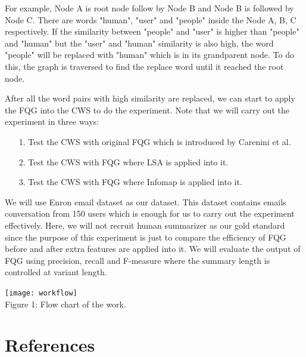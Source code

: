 \documentclass[a4paper, 12pt]{article}
\begin{document}
\begin{description}
For example, Node A is root node follow by Node B and Node B is followed by Node C. There are words "human", "user" and "people" inside the Node A, B, C respectively. If the similarity between "people" and "user" is higher than "people" and "human" but the "user" and "human" similarity is also high, the word "people" will be replaced with "human" which is in its grandparent node. To do this, the graph is traversed to find the replace word until it reached the root node.
\end{description}

\noindent
After all the word pairs with high similarity are replaced, we can start to apply the FQG into the CWS to do the experiment. Note that we will carry out the experiment in three ways:

\begin{itemize}
	\item[1.] Test the CWS with original FQG which is introduced by Carenini et al.

	\item[2.] Test the CWS with FQG where LSA is applied into it.

	\item[3.] Test the CWS with FQG where Infomap is applied into it.
\end{itemize}

\noindent
We will use Enron email dataset as our dataset. This dataset contains emails conversation from 150 users which is enough for us to carry out the experiment effectively. Here, we will not recruit human summarizer as our gold standard since the purpose of this experiment is just to compare the efficiency of FQG before and after extra features are applied into it. We will evaluate the output of FQG using precision, recall and F-measure where the summary length is controlled at variant length.
\begin{center}
\texttt{[image: workflow]}\\
Figure 1: Flow chart of the work.\\
\end{center}

\section*{References}
\renewcommand\refname{\vskip -1.35cm} %
{}
\end{document}

